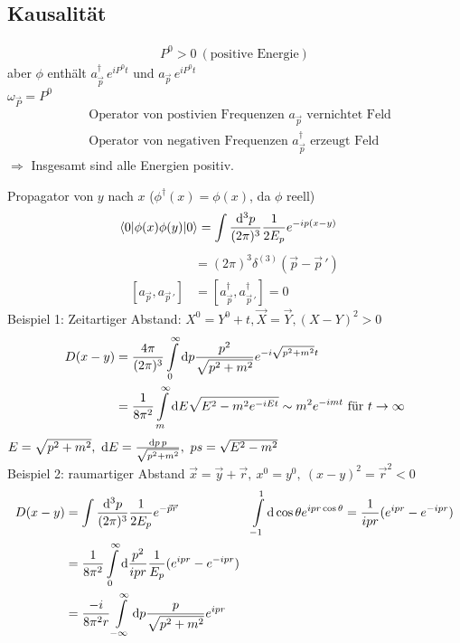 \subsection{Kausalität}
	\begin{align*}
		P^0 > 0 ~(\text{positive Energie})
	\end{align*}
aber $\phi$ enthält $a^\dagger_{\vec{p}} \,e^{i P^0 t}$ und $a_{\vec{p}} \,e^{i P^0 t}$
\\
$\omega_{\vec{P}} = P^0$
	\begin{align*}
		&\text{Operator von postivien Frequenzen } a_{\vec{p}} \text{ vernichtet Feld} \\
		&\text{Operator von negativen Frequenzen } a^\dagger_{\vec{p}} \text{ erzeugt Feld}
	\end{align*}
$\Rightarrow$ Insgesamt sind alle Energien positiv.

Propagator von $y$ nach $x$ ($\phi^\dagger (x) = \phi (x)$, da $\phi$ reell) 
	\begin{align*}
		\braket{0 | \phi (x) \phi(y) | 0} &= 
		\int \frac{\mathrm{d}^3 p}{(2 \pi)^3} \frac{1}{2 E_p} 
		e^{- i p (x -y)} 
	\end{align*}
	\begin{align*}
		[a_{\vec{p}}, a^\dagger_{\vec{p}\,'}] &= (2 \pi)^3 \delta^{(3)} (\vec{p}- \vec{p}\,') \\
		[a_{\vec{p}}, a_{\vec{p}\,'}] &= [a^\dagger_{\vec{p}}, a^\dagger_{\vec{p}\,'}] = 0
	\end{align*}
Beispiel 1: Zeitartiger Abstand: $X^0 = Y^0 + t, \vec{X} = \vec{Y}, (X - Y)^2 > 0$
	\begin{align*}
		D (x- y) &= \frac{4 \pi}{(2 \pi)^3} \int \limits_0^\infty \mathrm{d} p
		\frac{p^2}{\sqrt{p^2 + m^2}} e^{-i \sqrt{p^2 + m^2} t} \\
		&= \frac{1}{8 \pi^2} \int \limits_m^\infty \mathrm{d} E \sqrt{E^2 - m^2 e^{-iEt}}
		\sim m^2 e^{-imt} \text{ für } t \rightarrow \infty
	\end{align*} 
$E = \sqrt{p^2 + m^2},~\mathrm{d} E = \frac{\mathrm{d} p \,p}{\sqrt{p^2 + m^2}},~ ps = \sqrt{E^2- m^2}$
\\
Beispiel 2: raumartiger Abstand $\vec{x} = \vec{y} + \vec{r}, ~ x^0 = y^0, ~(x- y)^2 = \vec{r}^2 < 0$ 
	\begin{align*}
		D(x- y) &= \int \frac{\mathrm{d}^3 p}{(2 \pi)^3} \frac{1}{2 E_p} e^{- \vec{p} \vec{r}} & \int \limits_{-1}^{1} \mathrm{d} \cos \theta e^{i p r \cos \theta} &= \frac{1}{i p r} (e^{ipr} - e^{-ipr}) \\
		&= \frac{1}{8 \pi^2} \int \limits_0^\infty \mathrm{d} \frac{p^2}{i p r} \frac{1}{E_p} (e^{ipr} - e^{-ipr}) \\
		&= \frac{-i}{8 \pi^2 r} \int \limits_{-\infty}^\infty \mathrm{d} p \frac{p}{\sqrt{p^2 +m^2}} e^{ipr}
	\end{align*}
 
